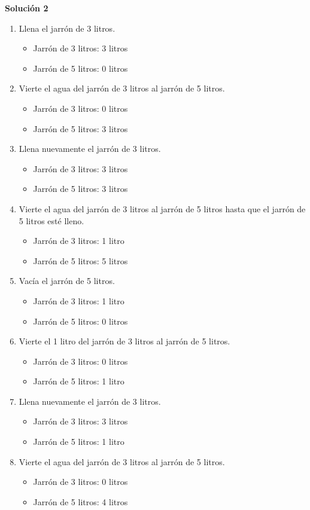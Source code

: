 \textbf{Solución 2}
\begin{enumerate} 
    \item Llena el jarrón de 3 litros. 
    \begin{itemize}
        \item Jarrón de 3 litros: 3 litros
        \item Jarrón de 5 litros: 0 litros
    \end{itemize} 
    \item Vierte el agua del jarrón de 3 litros al jarrón de 5 litros. \begin{itemize} 
        \item Jarrón de 3 litros: 0 litros 
        \item Jarrón de 5 litros: 3 litros 
    \end{itemize} 
    \item Llena nuevamente el jarrón de 3 litros. 
    \begin{itemize} 
        \item Jarrón de 3 litros: 3 litros 
        \item Jarrón de 5 litros: 3 litros 
    \end{itemize} 
    \item Vierte el agua del jarrón de 3 litros al jarrón de 5 litros hasta que el jarrón de 5 litros esté lleno.
    \begin{itemize} 
        \item Jarrón de 3 litros: 1 litro 
        \item Jarrón de 5 litros: 5 litros 
    \end{itemize} \item Vacía el jarrón de 5 litros. 
    \begin{itemize}
        \item Jarrón de 3 litros: 1 litro 
        \item Jarrón de 5 litros: 0 litros 
    \end{itemize} 
    \item Vierte el 1 litro del jarrón de 3 litros al jarrón de 5 litros. \begin{itemize} 
        \item Jarrón de 3 litros: 0 litros 
        \item Jarrón de 5 litros: 1 litro 
    \end{itemize}
    \item Llena nuevamente el jarrón de 3 litros. 
    \begin{itemize} 
        \item Jarrón de 3 litros: 3 litros 
        \item Jarrón de 5 litros: 1 litro 
    \end{itemize} 
    \item Vierte el agua del jarrón de 3 litros al jarrón de 5 litros.
    \begin{itemize} 
        \item Jarrón de 3 litros: 0 litros
        \item Jarrón de 5 litros: 4 litros 
    \end{itemize} 
\end{enumerate}